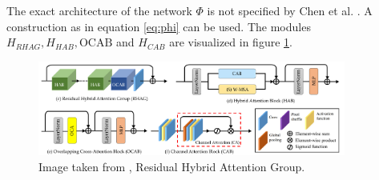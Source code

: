 The exact architecture of the network $\Phi$ is not specified by Chen et al. \cite{chenHATHybridAttention2024}.
A construction as in equation \ref{eq:phi} can be used.
The modules $H_{RHAG}, H_{HAB}, \text{OCAB}$ and $H_{CAB}$ are visualized in figure \ref{fig:hat_modules}.

\begin{figure}[h!]
    \includegraphics[width=0.9\textwidth]{models/sisr/imgs/rhag.png}
    \caption{Image taken from \cite{chenHATHybridAttention2024}, Residual Hybrid Attention Group.}
    \label{fig:hat_modules}
\end{figure}